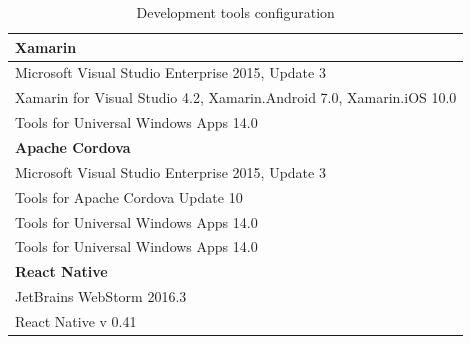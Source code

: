 \documentclass[english,master,public,dept460,male,cpdeclaration,oneside]{diploma}
\begin{document}
\begin{table}[!h]
	\centering
	\caption{Development tools configuration}
	\begin{tabular}{l}
		\toprule
		\textbf{Xamarin}\\
		\midrule
		Microsoft Visual Studio Enterprise 2015, Update 3 \\
		Xamarin for Visual Studio 4.2, Xamarin.Android 7.0, Xamarin.iOS 10.0 \\
		Tools for Universal Windows Apps 14.0 \\
		\midrule
		\textbf{Apache Cordova}\\
		\midrule
		Microsoft Visual Studio Enterprise 2015, Update 3 \\
		Tools for Apache Cordova Update 10 \\
		Tools for Universal Windows Apps 14.0 \\
		Tools for Universal Windows Apps 14.0 \\
		\midrule
		\textbf{React Native}\\
		\midrule
		JetBrains WebStorm 2016.3 \\
		React Native v 0.41\\	
		\midrule	
	\end{tabular}
\end{table}
\end{document}
